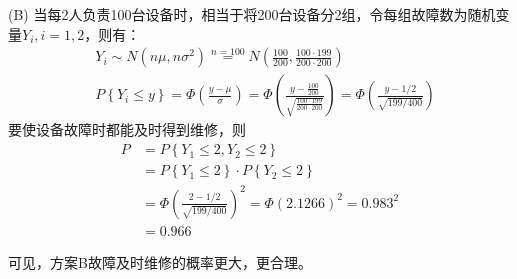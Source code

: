 (B) 当每2人负责100台设备时，相当于将200台设备分2组，令每组故障数为随机变量$Y_i,i=1,2$，则有：
\begin{align*}
&Y_i\sim N\left( n\mu ,n\sigma ^2 \right) \overset{n=100}{=}N\left( \frac{100}{200},\frac{100\cdot 199}{200\cdot 200} \right) \\
&P\left\{ Y_i\leqslant y \right\} =\varPhi \left( \frac{y-\mu}{\sigma} \right) =\varPhi \left( \frac{y-\frac{100}{200}}{\sqrt{\frac{100\cdot 199}{200\cdot 200}}} \right) =\varPhi \left( \frac{y-1/2}{\sqrt{199/400}} \right)
\end{align*}
要使设备故障时都能及时得到维修，则
\begin{align*}
P&=P\left\{ Y_1\leqslant 2,Y_2\leqslant 2 \right\} \\
&=P\left\{ Y_1\leqslant 2 \right\} \cdot P\left\{ Y_2\leqslant 2 \right\} \\
&=\varPhi \left( \frac{2-1/2}{\sqrt{199/400}} \right) ^2=\varPhi \left( 2.1266 \right) ^2=0.983^2 \\
&=0.966
\end{align*}

可见，方案B故障及时维修的概率更大，更合理。




